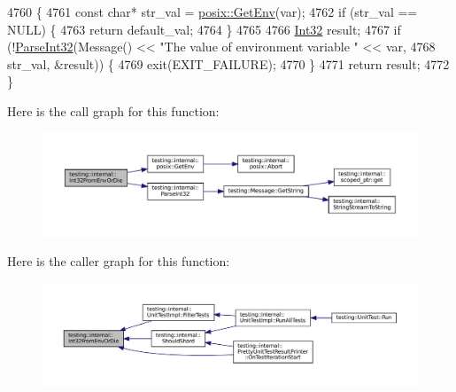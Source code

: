 \begin{DoxyCode}
4760                                                             \{
4761   \textcolor{keyword}{const} \textcolor{keywordtype}{char}* str\_val = \hyperlink{namespacetesting_1_1internal_1_1posix_a1d5e3da5a27eed25986859fa83cafe95}{posix::GetEnv}(var);
4762   \textcolor{keywordflow}{if} (str\_val == NULL) \{
4763     \textcolor{keywordflow}{return} default\_val;
4764   \}
4765 
4766   \hyperlink{namespacetesting_1_1internal_a8ee38faaf875f133358abaf9bc056cec}{Int32} result;
4767   \textcolor{keywordflow}{if} (!\hyperlink{namespacetesting_1_1internal_ac06fc81336a3d80755f4020d34321766}{ParseInt32}(Message() << \textcolor{stringliteral}{"The value of environment variable "} << var,
4768                   str\_val, &result)) \{
4769     exit(EXIT\_FAILURE);
4770   \}
4771   \textcolor{keywordflow}{return} result;
4772 \}
\end{DoxyCode}
Here is the call graph for this function\+:
\nopagebreak
\begin{figure}[H]
\begin{center}
\leavevmode
\includegraphics[width=350pt]{namespacetesting_1_1internal_aaa576613655c2f380278c255c3ec5fef_cgraph}
\end{center}
\end{figure}
Here is the caller graph for this function\+:
\nopagebreak
\begin{figure}[H]
\begin{center}
\leavevmode
\includegraphics[width=350pt]{namespacetesting_1_1internal_aaa576613655c2f380278c255c3ec5fef_icgraph}
\end{center}
\end{figure}
\mbox{\label{namespacetesting_1_1internal_a0f7e728793f9e6cb0aa2b69eaa468bf3}} 
